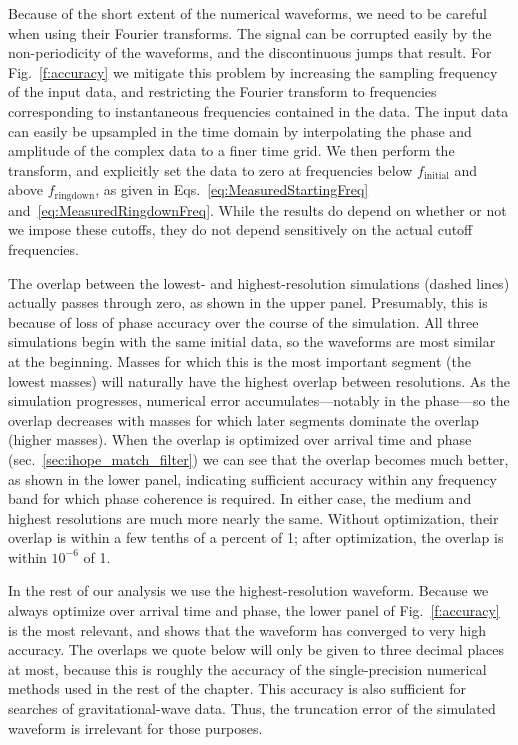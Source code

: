 Because of the short extent of the numerical waveforms, we need to be
careful when using their Fourier transforms.  The signal can be
corrupted easily by the non-periodicity of the waveforms, and the
discontinuous jumps that result.  For Fig.~\ref{f:accuracy} we
mitigate this problem by increasing the sampling frequency of the
input data, and restricting the Fourier transform to frequencies
corresponding to instantaneous frequencies contained in the data.  The
input data can easily be upsampled in the time domain by interpolating
the phase and amplitude of the complex data to a finer time grid.  We
then perform the transform, and explicitly set the data to zero at
frequencies below $f_{\mathrm{initial}}$ and above
$f_{\mathrm{ringdown}}$, as given in
Eqs.~\ref{eq:MeasuredStartingFreq} and~\ref{eq:MeasuredRingdownFreq}.
While the results do depend on whether or not we impose these cutoffs,
they do not depend sensitively on the actual cutoff frequencies.

The overlap between the lowest- and highest-resolution simulations
(dashed lines) actually passes through zero, as shown in the upper
panel.  Presumably, this is because of loss of phase accuracy over the
course of the simulation.  All three simulations begin with the same
initial data, so the waveforms are most similar at the beginning.
Masses for which this is the most important segment (the lowest
masses) will naturally have the highest overlap between resolutions.
As the simulation progresses, numerical error accumulates---notably in
the phase---so the overlap decreases with masses for which later
segments dominate the overlap (higher masses).  When the overlap is
optimized over arrival time and phase
(sec.~\ref{sec:ihope_match_filter}) we can see that the overlap
becomes much better, as shown in the lower panel, indicating
sufficient accuracy within any frequency band for which phase
coherence is required.  In either case, the medium and highest
resolutions are much more nearly the same.  Without optimization,
their overlap is within a few tenths of a percent of 1; after
optimization, the overlap is within $10^{-6}$ of 1.

In the rest of our analysis we use the highest-resolution waveform.
Because we always optimize over arrival time and phase, the lower
panel of Fig.~\ref{f:accuracy} is the most relevant, and shows that
the waveform has converged to very high accuracy.  The overlaps we
quote below will only be given to three decimal places at most,
because this is roughly the accuracy of the single-precision numerical
methods used in the rest of the chapter.  This accuracy is also
sufficient for searches of gravitational-wave data.  Thus, the
truncation error of the simulated waveform is irrelevant for those
purposes.

